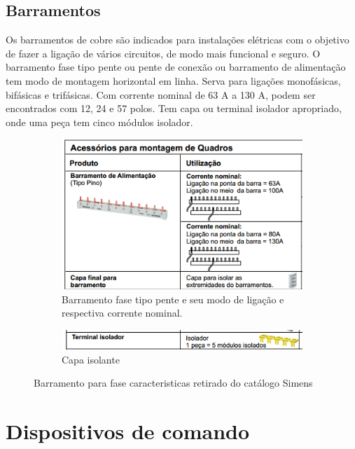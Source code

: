 \subsection{Barramentos}
Os barramentos de cobre são indicados para instalações elétricas com o objetivo de fazer a ligação de vários circuitos, de modo mais funcional e seguro.
O barramento fase tipo pente ou pente de conexão ou barramento de alimentação tem modo de montagem horizontal em linha. Serva para ligações monofásicas, bifásicas e trifásicas. Com corrente nominal de 63 A a 130 A, podem ser encontrados com 12, 24 e 57 polos. Tem capa ou terminal isolador apropriado, onde uma peça tem cinco módulos isolador. 
\begin{figure}
\centering
\begin{subfigure}{0.4\textwidth}
	\includegraphics[width=\textwidth]{image/barramentofase.png}
	\caption{Barramento fase tipo pente e seu modo de ligação e respectiva corrente nominal. }
	\label{fig:advQD_1}
\end{subfigure}
\hfill
\begin{subfigure}{0.4\textwidth}
    \includegraphics[width=\textwidth]{image/barramentocapa.png}
    \caption{Capa isolante}
    \label{fig:advQD_2}
\end{subfigure}
\caption{Barramento para fase caracteristicas retirado do catálogo Simens}
\label{fig:advQD}
\end{figure}

\section{Dispositivos de comando}
